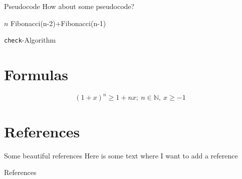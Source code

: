 \documentclass[aspectratio=169]{beamer}
\begin{document}
\begin{frame}{Pseudocode}
	\Large
	How about some pseudocode?

	\begin{algorithm}[H]
	\begin{algorithmic}[1]
				\Return $n$
			\Else
				\Return Fibonacci(n-2)+Fibonacci(n-1)
			\EndIf

		\EndFunction
	\end{algorithmic}

	\caption{\texttt{check}-Algorithm}
	\label{alg-check}
	\end{algorithm}

\end{frame}

\section{Formulas}

\begin{frame}
	$$(1+x)^n \geq 1 + nx; ~ n \in \mathbb{N},~ x\geq -1$$
\end{frame}


\section{References}

\begin{frame}{Some beautiful references}
	Here is some text where I want to add a reference \cite{Dittrich19}
\end{frame}

\begin{frame}{References}
    
    
\end{frame}
\end{document}
